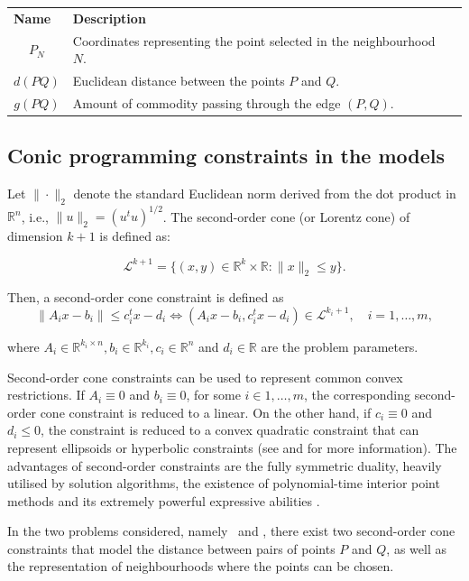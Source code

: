 \documentclass[a4paper,  review, authoryear, 1p.]{elsarticle}
\newcommand{\SPPN}{{\sf{H-SPPN}\xspace }}
\newcommand{\TSPN}{{\sf{H-TSPN}\xspace }}
\newcommand{\CV}[1]{{\color{red}#1}}
\begin{document}
\begin{table}[h!]
\begin{tabular}{|cl|l}
			\multicolumn{1}{|l|}{\textbf{Name}} & \textbf{Description} &  \\ \cline{1-2}
			\multicolumn{1}{|c|}{$P_N$} & Coordinates representing the point selected in the neighbourhood $N$. &  \\ \cline{1-2}
			\multicolumn{1}{|c|}{$d(PQ)$} & Euclidean distance between the points $P$ and $Q$. &  \\ \cline{1-2}
			\multicolumn{1}{|c|}{$g(PQ)$} & Amount of commodity passing through the edge $(P, Q)$. &  \\ \cline{1-2}
		\end{tabular}
	\end{table}
	
	\subsection{Conic programming constraints in the models}
	\CV{
	Let $\|\cdot\|_2$ denote the standard Euclidean norm derived from the dot product in $\mathbb R^n$, i.e., $\|u\|_2= (u^t u)^{1/2}$. The second-order cone (or Lorentz cone) of dimension $k+1$ is defined as:
	
	$$\mathcal L^{k+1}=\{(x, y)\in\mathbb R^k\times\mathbb R : \|x\|_2\leq y\}.$$
	
	Then, a second-order cone constraint is defined as
	\begin{equation*}
		\|A_ix-b_i\|\leq c_i^tx -d_i \Leftrightarrow (A_ix-b_i, c_i^t x-d_i)\in \mathcal L^{k_i+1},\quad i=1,\ldots,m,
	\end{equation*}
	
	where $A_i\in\mathbb R^{k_i\times n} , b_i\in\mathbb R^{k_i}, c_i\in \mathbb R^n$ and $d_i\in \mathbb R$ are the problem parameters. 
	
	Second-order cone constraints can be used to represent common convex restrictions. If $A_i\equiv 0$ and $b_i\equiv 0$,  for some $i\in 1,\ldots, m$, the corresponding second-order cone constraint is reduced to a linear. On the other hand, if $c_i\equiv 0$ and $d_i\leq 0$, the constraint is reduced to a convex quadratic constraint that can represent ellipsoids or hyperbolic constraints (see \citet{lobo1998a} and \citet{boyd2004} for more information). The advantages of second-order constraints are the fully symmetric duality, heavily utilised by solution algorithms, the existence of polynomial-time interior point methods and its extremely powerful expressive abilities \citep{nesterov1994a}. }
	
	In the two problems considered, namely \SPPN \ and \TSPN, there exist two second-order cone constraints that model the distance between pairs of points $P$ and $Q$, as well as the representation of neighbourhoods where the points can be chosen.
	
\end{document}
